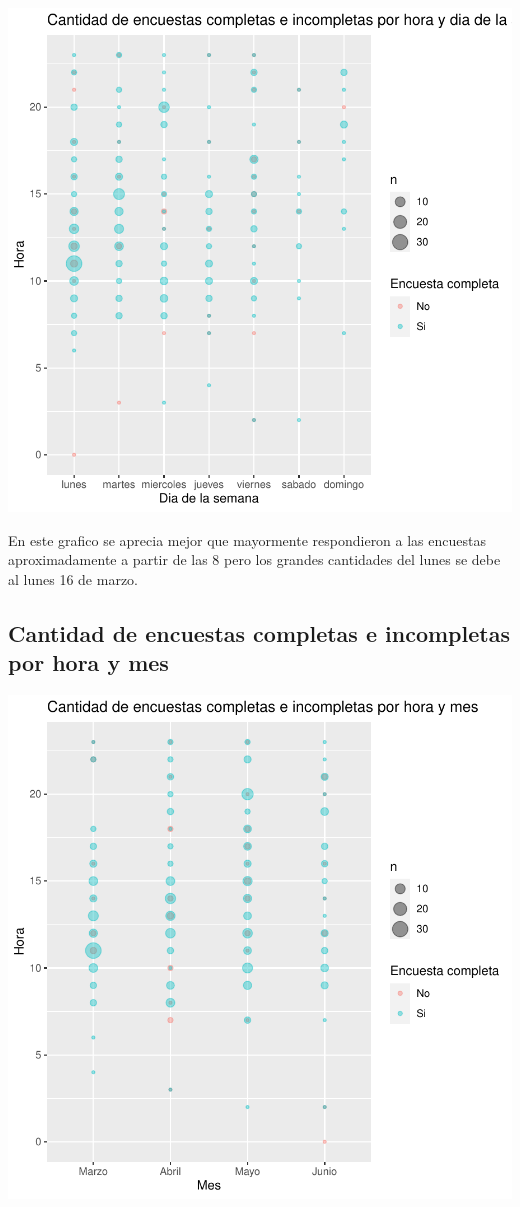 \documentclass{article}
\begin{document}
\includegraphics{seguimientov3-071}

En este grafico se aprecia mejor que mayormente respondieron a las encuestas aproximadamente a partir de las 8 pero los grandes cantidades del lunes se debe al lunes 16 de marzo.

\subsection{Cantidad de encuestas completas e incompletas por hora y mes}

\includegraphics{seguimientov3-072}
\end{document}
